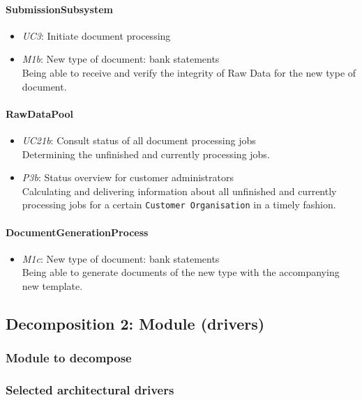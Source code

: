 \documentclass[a4paper,10pt]{article}
\begin{document}
\paragraph{SubmissionSubsystem}
\begin{itemize}
    \item \emph{UC3}: Initiate document processing
    \item \emph{M1b}: New type of document: bank statements\\
    Being able to receive and verify the integrity of Raw Data for the new type of document.
\end{itemize}

\paragraph{RawDataPool}
\begin{itemize}
    \item \emph{UC21b}: Consult status of all document processing jobs\\
    Determining the unfinished and currently processing jobs.
    \item \emph{P3b}: Status overview for customer administrators\\
    Calculating and delivering information about all unfinished and currently processing jobs for a certain \texttt{Customer Organisation} in a timely fashion.
\end{itemize}

\paragraph{DocumentGenerationProcess}
\begin{itemize}
    \item \emph{M1c}: New type of document: bank statements\\
    Being able to generate documents of the new type with the accompanying new template.
\end{itemize}

\subsection{Decomposition 2: Module (drivers)}
\subsubsection{Module to decompose}
\subsubsection{Selected architectural drivers}
\end{document}
